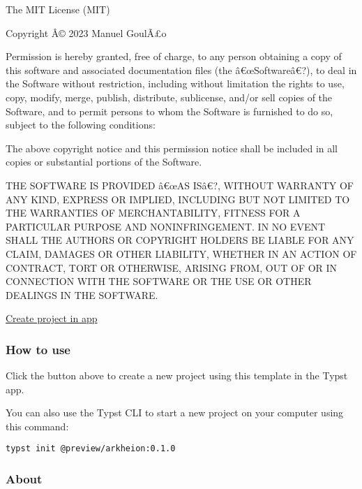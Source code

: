The MIT License (MIT)

Copyright Â© 2023 Manuel GoulÃ£o

Permission is hereby granted, free of charge, to any person obtaining a
copy of this software and associated documentation files (the
â€œSoftwareâ€?), to deal in the Software without restriction, including
without limitation the rights to use, copy, modify, merge, publish,
distribute, sublicense, and/or sell copies of the Software, and to
permit persons to whom the Software is furnished to do so, subject to
the following conditions:

The above copyright notice and this permission notice shall be included
in all copies or substantial portions of the Software.

THE SOFTWARE IS PROVIDED â€œAS ISâ€?, WITHOUT WARRANTY OF ANY KIND,
EXPRESS OR IMPLIED, INCLUDING BUT NOT LIMITED TO THE WARRANTIES OF
MERCHANTABILITY, FITNESS FOR A PARTICULAR PURPOSE AND NONINFRINGEMENT.
IN NO EVENT SHALL THE AUTHORS OR COPYRIGHT HOLDERS BE LIABLE FOR ANY
CLAIM, DAMAGES OR OTHER LIABILITY, WHETHER IN AN ACTION OF CONTRACT,
TORT OR OTHERWISE, ARISING FROM, OUT OF OR IN CONNECTION WITH THE
SOFTWARE OR THE USE OR OTHER DEALINGS IN THE SOFTWARE.

\href{/app?template=arkheion&version=0.1.0}{Create project in app}

\subsubsection{How to use}\label{how-to-use}

Click the button above to create a new project using this template in
the Typst app.

You can also use the Typst CLI to start a new project on your computer
using this command:

\begin{verbatim}
typst init @preview/arkheion:0.1.0
\end{verbatim}



\subsubsection{About}\label{about}


